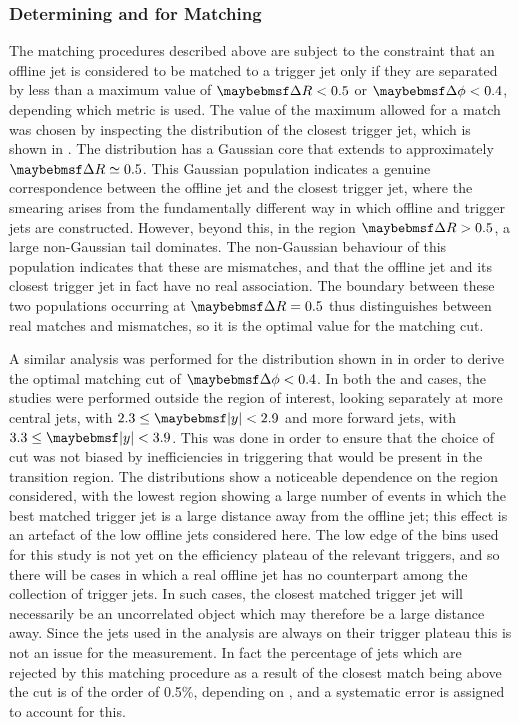 \subsubsection{Determining \DeltaR and \DeltaPhi for Matching}
\label{sec:dijets:matching}
The matching procedures described above are subject to the constraint that an offline
jet is considered to be matched to a trigger jet only if they are separated by less
than a maximum value of $\DeltaR < 0.5$ or $\DeltaPhi < 0.4$, depending which metric
is used. The value of the maximum \DeltaR allowed for a match was chosen by inspecting
the \DeltaR distribution of the closest trigger jet, which is shown in
. The distribution has a Gaussian core that extends
to approximately $\DeltaR \simeq 0.5$. This Gaussian population indicates a genuine
correspondence between the offline jet and the closest trigger jet, where the smearing
arises from the fundamentally different way in which offline and trigger jets are constructed.
However, beyond this, in the region $\DeltaR > 0.5$, a large non-Gaussian tail dominates.
The non-Gaussian behaviour of this population indicates that these are mismatches,
and that the offline jet and its closest trigger jet in fact have no real association.
The boundary between these two populations occurring at $\DeltaR=0.5$ thus distinguishes
between real matches and mismatches, so it is the optimal value for the \DeltaR
matching cut.

A similar analysis was performed for the \DeltaPhi distribution shown
in  in order to derive the optimal matching cut of
$\DeltaPhi < 0.4$. In both the \DeltaR and \DeltaPhi cases, the studies were performed
outside the region of interest, looking separately at more central jets, with $2.3 \leq \absRap < 2.9$
and more forward jets, with $3.3 \leq \absRap < 3.9$. This was done in order to
ensure that the choice of cut was not biased by inefficiencies in triggering that
would be present in the transition region. The distributions show a noticeable dependence
on the \pT region considered, with the lowest \pT region showing a large number of
events in which the best matched trigger jet is a large distance away from the offline
jet; this effect is an artefact of the low \pT offline jets considered
here. The low edge of the \pT bins used for this study is not yet on the efficiency plateau of the
relevant triggers, and so there will be cases in which a real offline jet has no
counterpart among the collection of trigger jets. In such cases, the closest matched
trigger jet will necessarily be an uncorrelated object which may therefore be a large
distance away. Since the jets used in the analysis are always on their trigger plateau
this is not an issue for the measurement. In fact the percentage of jets which are
rejected by this matching procedure as a result of the closest match being above the
cut is of the order of 0.5\%, depending on \pT, and a systematic error is assigned
to account for this.

